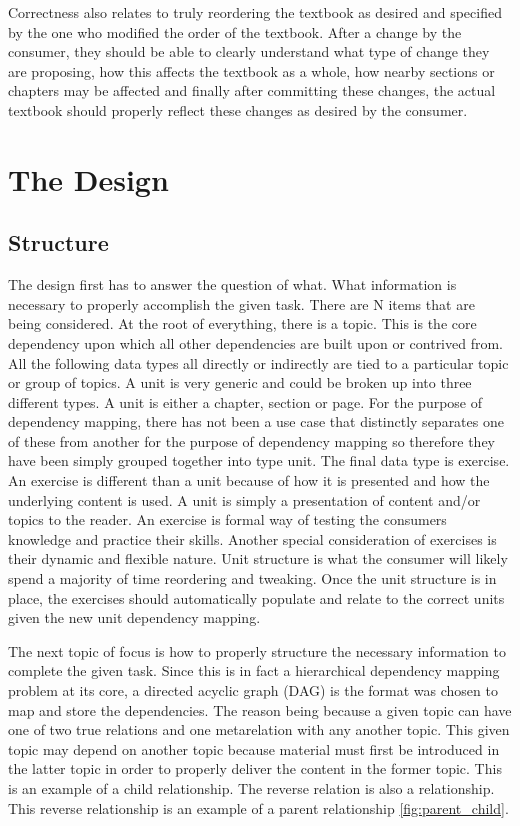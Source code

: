 Correctness also relates to truly reordering the textbook as desired and specified by the one who modified the order of the textbook. After a change by the consumer, they should be able to clearly understand what type of change they are proposing, how this affects the textbook as a whole, how nearby sections or chapters may be affected and finally after committing these changes, the actual textbook should properly reflect these changes as desired by the consumer. 

\section{The Design}

\subsection{Structure}

The design first has to answer the question of what. What information is necessary  to properly accomplish the given task. There are N items that are being considered. At the root of everything, there is a topic. This is the core dependency upon which all other dependencies are built upon or contrived from. All the following data types all directly or indirectly are tied to a particular topic or group of topics. A unit is very generic and could be broken up into three different types. A unit is either a chapter, section or page. For the purpose of dependency mapping, there has not been a use case that distinctly separates one of these from another for the purpose of dependency mapping so therefore they have been simply grouped together into type unit. The final data type is exercise. An exercise is different than a unit because of how it is presented and how the underlying content is used. A unit is simply a presentation of content and/or topics to the reader. An exercise is formal way of testing the consumers knowledge and practice their skills. Another special consideration of exercises is their dynamic and flexible nature. Unit structure is what the consumer will likely spend a majority of time reordering and tweaking. Once the unit structure is in place, the exercises should automatically populate and relate to the correct units given the new unit dependency mapping.

The next topic of focus is how to properly structure the necessary information to complete the given task. Since this is in fact a hierarchical dependency mapping problem at its core, a directed acyclic graph (DAG) is the format was chosen to map and store the dependencies. The reason being because a given topic can have one of two true relations and one metarelation with any another topic. This given topic may depend on another topic because material must first be introduced in the latter topic in order to properly deliver the content in the former topic. This is an example of a child relationship. The reverse relation is also a relationship. This reverse relationship is an example of a parent relationship \ref{fig:parent_child}.


